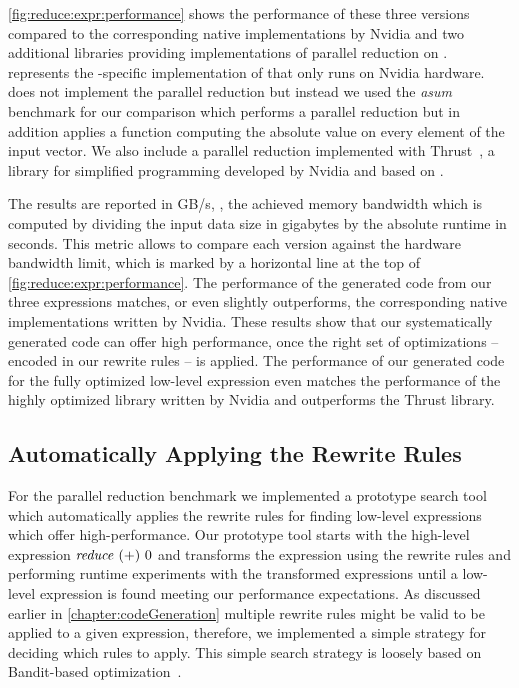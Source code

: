 \autoref{fig:reduce:expr:performance} shows the performance of these three versions compared to the corresponding native \OpenCL implementations by Nvidia and two additional libraries providing implementations of parallel reduction on \GPUs.
\CUBLAS~\cite{cuBLAS} represents the \CUDA-specific implementation of \BLAS that only runs on Nvidia hardware.
\BLAS does not implement the parallel reduction but instead we used the \emph{asum} benchmark for our comparison which performs a parallel reduction but in addition applies a function computing the absolute value on every element of the input vector.
We also include a parallel reduction implemented with Thrust~\cite{BellHo2011}, a library for simplified \GPU programming developed by Nvidia and based on \CUDA.

The results are reported in GB/s, \ie, the achieved memory bandwidth which is computed by dividing the input data size in gigabytes by the absolute runtime in seconds.
This metric allows to compare each version against the hardware bandwidth limit, which is marked by a horizontal line at the top of \autoref{fig:reduce:expr:performance}.
The performance of the generated \OpenCL code from our three expressions matches, or even slightly outperforms, the corresponding native \OpenCL implementations written by Nvidia.
These results show that our systematically generated code can offer high performance, once the right set of optimizations -- encoded in our rewrite rules -- is applied.
The performance of our generated code for the fully optimized low-level expression even matches the performance of the highly optimized \CUBLAS library written by Nvidia and outperforms the Thrust library.

\subsection{Automatically Applying the Rewrite Rules}
\label{sec:codeGeneration-evaluation:automatic}

For the parallel reduction benchmark we implemented a prototype search tool which automatically applies the rewrite rules for finding low-level expressions which offer high-performance.
Our prototype tool starts with the high-level expression $\text{\textit{reduce}}\ (+)\ 0$ and transforms the expression using the rewrite rules and performing runtime experiments with the transformed expressions until a low-level \OpenCL expression is found meeting our performance expectations.
As discussed earlier in \autoref{chapter:codeGeneration} multiple rewrite rules might be valid to be applied to a given expression, therefore, we implemented a simple strategy for deciding which rules to apply.
This simple search strategy is loosely based on Bandit-based optimization~\cite{MesmayRVP09}.

